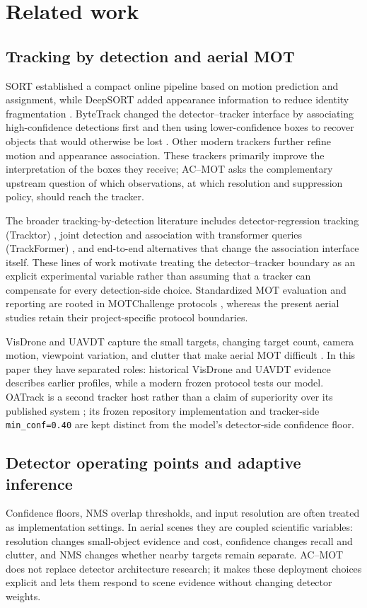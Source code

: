 \section{Related work}
\subsection{Tracking by detection and aerial MOT}
SORT established a compact online pipeline based on motion prediction and
assignment, while DeepSORT added appearance information to reduce identity
fragmentation \cite{bewley2016sort,wojke2017deepsort}. ByteTrack changed the
detector--tracker interface by associating high-confidence detections first and
then using lower-confidence boxes to recover objects that would otherwise be
lost \cite{zhang2022bytetrack}. Other modern trackers further refine motion and
appearance association. These trackers primarily improve the interpretation
of the boxes they receive; AC--MOT asks the complementary upstream question of
which observations, at which resolution and suppression policy, should reach
the tracker.

The broader tracking-by-detection literature includes detector-regression
tracking (Tracktor) \cite{bergmann2019tracktor}, joint detection and association
with transformer queries (TrackFormer) \cite{meinhardt2022trackformer}, and
end-to-end alternatives that change the association interface itself. These
lines of work motivate treating the detector--tracker boundary as an explicit
experimental variable rather than assuming that a tracker can compensate for
every detection-side choice. Standardized MOT evaluation and reporting are
rooted in MOTChallenge protocols \cite{milan2020motchallenge},
whereas the present aerial studies retain their project-specific protocol
boundaries.

VisDrone and UAVDT capture the small targets, changing target count, camera
motion, viewpoint variation, and clutter that make aerial MOT difficult
\cite{zhu2022visdrone,du2018uavdt}. In this paper they have separated roles:
historical VisDrone and UAVDT evidence describes earlier profiles, while a
modern frozen protocol tests our model. OATrack is a second tracker host rather
than a claim of superiority over its published system \cite{qi2026oatrack}; its
frozen repository implementation and tracker-side \texttt{min\_conf=0.40} are
kept distinct from the model's detector-side confidence floor.

\subsection{Detector operating points and adaptive inference}
Confidence floors, NMS overlap thresholds, and input resolution are often
treated as implementation settings. In aerial scenes they are coupled
scientific variables: resolution changes small-object evidence and cost,
confidence changes recall and clutter, and NMS changes whether nearby targets
remain separate. AC--MOT does not replace detector architecture research; it
makes these deployment choices explicit and lets them respond to scene evidence
without changing detector weights.

